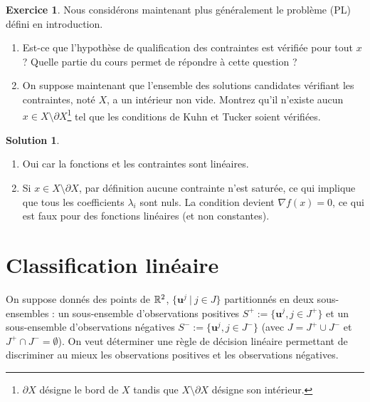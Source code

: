 \documentclass[a4paper,francais]{article}
\newcommand{\R}{{\ensuremath\mathbb{R}}}
\theoremstyle{definition}
\newtheorem{exercice}{Exercice}[section]
\newtheorem*{solution}{Solution}
\begin{document}
\begin{exercice}
  Nous considérons maintenant plus généralement le problème (PL) défini
  en introduction. 
  \begin{enumerate}
  \item Est-ce que l'hypothèse de qualification des contraintes est vérifiée
    pour tout $x$ ? Quelle partie du cours permet de répondre à cette question ?
  \item On suppose maintenant que l'ensemble des solutions candidates vérifiant
    les contraintes, noté $X$, a un intérieur non vide. Montrez qu'il n'existe
    aucun $x \in X \setminus \partial X$\footnote{$\partial X$ désigne le bord
      de $X$ tandis que $X \setminus \partial X$ désigne son intérieur.}
    tel que les conditions de Kuhn et Tucker soient vérifiées. 
  \end{enumerate}
\end{exercice}

\begin{solution}
  \begin{enumerate}
  \item Oui car la fonctions et les contraintes sont linéaires.
  \item Si $x \in X \setminus \partial X$, par définition aucune contrainte n'est saturée,
  ce qui implique que tous les coefficients $\lambda_i$ sont nuls. La condition
  devient ${\nabla f}(x) = 0$, ce qui est faux pour des fonctions linéaires (et non
  constantes).
  \end{enumerate}
\end{solution}

\section{Classification linéaire}
\label{sec:classif}

\let\vec\mathbf

On suppose donnés des points de $\R^2$, $\{\vec{u}^j \ | \ {j \in J} \}$ partitionnés en deux sous-ensembles :
un sous-ensemble d'observations positives $S^+ := \{ \vec{u}^j, j \in J^+ \}$ et un sous-ensemble
d'observations négatives $S^- := \{ \vec{u}^j, j \in J^- \}$
(avec $J = J^+ \cup J^-$ et $J^+ \cap J^- = \emptyset$).
On veut déterminer une règle de décision linéaire permettant de discriminer au mieux
les observations positives et les observations négatives.
\end{document}
